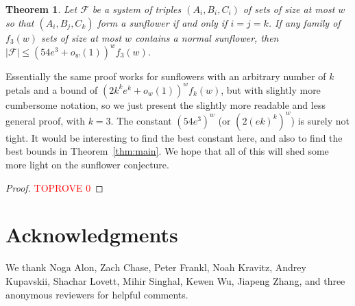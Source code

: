 \documentclass[12pt]{article}
\newtheorem{theorem}{Theorem}[section]
\newcommand{\F}{\mathcal{F}}
\begin{document}
\begin{theorem}
	Let $\F$ be a system of triples $(A_i, B_i, C_i)$ of sets of size at most $w$ so that $(A_i, B_j, C_k)$ form a sunflower if and only if $i=j=k$.  If any family of $f_3(w)$ sets of size at most $w$ contains a normal sunflower, then $|\F| \le (54e^3+o_w(1))^wf_3(w)$.
\end{theorem}

Essentially the same proof works for sunflowers with an arbitrary number of $k$ petals and a bound of $(2k^ke^k+o_w(1))^wf_k(w)$, but with slightly more cumbersome notation, so we just present the slightly more readable and less general proof, with $k=3$.  The constant $(54e^3)^w$ (or $(2(ek)^k)^w$) is surely not tight.  It would be interesting to find the best constant here, and also to find the best bounds in Theorem~\ref{thm:main}. \iffalse and in Theorem~\ref{thm:furedi}.  \fi We hope that all of this will shed some more light on the sunflower conjecture.

\begin{proof}\textcolor{red}{TOPROVE 0}\end{proof}





\section{Acknowledgments}

We thank Noga Alon, Zach Chase, Peter Frankl, Noah Kravitz, Andrey Kupavskii, Shachar Lovett, Mihir Singhal, Kewen Wu, Jiapeng Zhang, and three anonymous reviewers for helpful comments.
\end{document}
